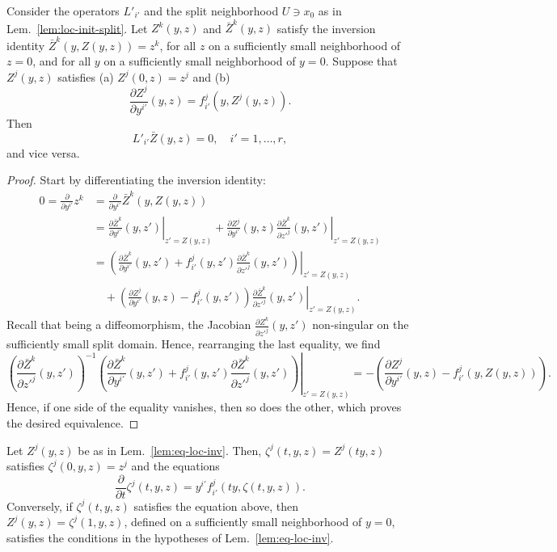 \begin{lemma} \label{lem:eq-loc-inv}
Consider the operators $L'_{i'}$ and the split neighborhood $U\ni x_0$ as in
Lem.~\ref{lem:loc-init-split}. Let $Z^k(y,z)$ and $\bar{Z}^k(y,z)$ satisfy the
inversion identity $\bar{Z}^k(y, Z(y, z)) = z^k$, for all $z$ on a sufficiently
small neighborhood of $z=0$, and for all $y$ on a sufficiently small
neighborhood of $y=0$. Suppose that $Z^j(y,z)$ satisfies (a) $Z^j(0,z) = z^j$
and (b)
\[
  \frac{\partial Z^j}{\partial y^{i'}}(y,z) = f_{i'}^j(y, Z^j(y,z)) .
\]
Then
\[
  L'_{i'} \bar{Z}(y,z) = 0, \quad i'=1,\ldots,r ,
\]
and vice versa.
\end{lemma}
\begin{proof}
Start by differentiating the inversion identity:
\begin{align*}
  0 = \frac{\partial}{\partial y^{i'}} z^k
  &= \frac{\partial}{\partial y^{i'}} \bar{Z}^k(y, Z(y, z))
  \\
  &= \left. \frac{\partial \bar{Z}^k}{\partial y^{i'}}(y, z') \right|_{z'=Z(y,z)}
    + \frac{\partial Z^j}{\partial y^{i'}}(y,z)
      \left. \frac{\partial \bar{Z}^k}{\partial z'^j}(y,z') \right|_{z'=Z(y,z)}
  \\
  &= \left. \left(\frac{\partial \bar{Z}^k}{\partial y^{i'}}(y, z')
      + f_{i'}^j(y,z') \frac{\partial \bar{Z}^k}{\partial z'^j}(y,z')\right) \right|_{z'=Z(y,z)}
    \\ &\quad {}
    + \left. \left(\frac{\partial Z^j}{\partial y^{i'}}(y,z) - f_{i'}^j(y,z')\right)
      \frac{\partial \bar{Z}^k}{\partial z'^j}(y,z') \right|_{z'=Z(y,z)}
    .
\end{align*}
Recall that being a diffeomorphism, the Jacobian $\frac{\partial Z^k}{\partial
z'^j}(y,z')$ non-singular on the sufficiently small split domain. Hence,
rearranging the last equality, we find
\[
  \left. \left(\frac{\partial \bar{Z}^k}{\partial z'^j}(y,z')\right)^{-1}
    \left(\frac{\partial \bar{Z}^k}{\partial y^{i'}}(y, z')
      + f_{i'}^j(y,z') \frac{\partial \bar{Z}^k}{\partial z'^j}(y,z')\right) \right|_{z'=Z(y,z)}
  = -\left(\frac{\partial Z^j}{\partial y^{i'}}(y,z) - f_{i'}^j(y,Z(y,z))\right) .
\]
Hence, if one side of the equality vanishes, then so does the other, which
proves the desired equivalence.
\end{proof}

\begin{lemma} \label{lem:eq-radial}
Let $Z^j(y,z)$ be as in Lem.~\ref{lem:eq-loc-inv}. Then, $\zeta^j(t,y,z) =
Z^j(ty,z)$ satisfies $\zeta^j(0,y,z) = z^j$ and the equations
\[
  \frac{\partial}{\partial t} \zeta^j(t,y,z) = y^{i'} f_{i'}^j(ty,\zeta(t,y,z)) .
\]
Conversely, if $\zeta^j(t,y,z)$ satisfies the equation above, then $Z^j(y,z) =
\zeta^j(1,y,z)$, defined on a sufficiently small neighborhood of $y=0$,
satisfies the conditions in the hypotheses of Lem.~\ref{lem:eq-loc-inv}.
\end{lemma}

